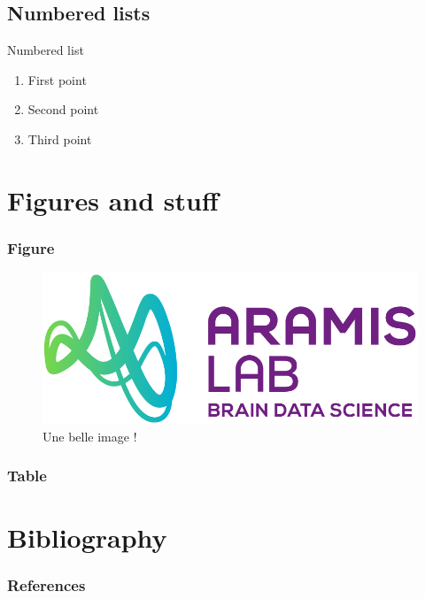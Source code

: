 \documentclass[
	11pt, %
	aspectratio=169, %
]{beamer}
\begin{document}
\subsection{Numbered lists}
\begin{frame}{Numbered list}
  \begin{enumerate}
    \item First point
    \item Second point
    \item Third point
  \end{enumerate}

\end{frame}



\section{Figures and stuff}

\begin{frame}
  \frametitle{Figure}

  \begin{figure}
    \includegraphics[height=.6\paperheight]{logos/logo_ARAMISLAB.png}
    \caption{Une belle image !}
  \end{figure}

\end{frame}

\begin{frame}
  \frametitle{Table}



\end{frame}


\section{Bibliography}

\begin{frame}
  \frametitle{References}

\end{frame}
\end{document}

